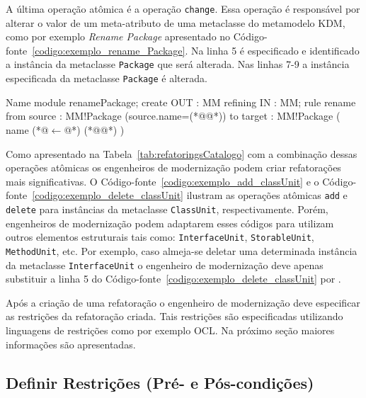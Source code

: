 A última operação atômica é a operação \texttt{change}. Essa operação é responsável por alterar o valor de um meta-atributo de uma metaclasse do metamodelo KDM, como por exemplo \textit{Rename Package} apresentado no Código-fonte~\ref{codigo:exemplo_rename_Package}. Na linha 5 é especificado e identificado a instância da metaclasse \texttt{Package} que será alterada. Nas linhas 7-9 a instância especificada da metaclasse \texttt{Package} é alterada.

\begin{codigo}[caption={[ATL para realizar a operação atômica \textit{change} \texttt{ClassUnit}.] ATL para realizar a operação atômica \textit{change} \texttt{ClassUnit}.},escapeinside={(*@}{@*)}, basicstyle=\footnotesize, label={codigo:exemplo_rename_Package}, language=ATL]{Name}
module renamePackage;
create OUT : MM refining IN : MM;
rule rename {
	from
		source : MM!Package (source.name=(*@@*))
	to 
		target : MM!Package (
			name (*@$\leftarrow$@*) (*@@*)
		)
}
\end{codigo}


Como apresentado na Tabela~\ref{tab:refatoringsCatalogo} com a combinação dessas operações atômicas os engenheiros de modernização podem criar refatorações mais significativas. O Código-fonte~\ref{codigo:exemplo_add_classUnit} e o Código-fonte~\ref{codigo:exemplo_delete_classUnit} ilustram as operações atômicas \texttt{add} e \texttt{delete} para instâncias da metaclasse \texttt{ClassUnit}, respectivamente. Porém, engenheiros de modernização podem adaptarem esses códigos para utilizam outros elementos estruturais tais como: \texttt{InterfaceUnit}, \texttt{StorableUnit}, \texttt{MethodUnit}, etc. Por exemplo, caso almeja-se deletar uma determinada instância da metaclasse \texttt{InterfaceUnit} o engenheiro de modernização deve apenas substituir a linha 5 do Código-fonte~\ref{codigo:exemplo_delete_classUnit} por . 

Após a criação de uma refatoração o engenheiro de modernização deve especificar as restrições da refatoração criada. Tais restrições são especificadas utilizando linguagens de restrições como por exemplo OCL. Na próximo seção maiores informações são apresentadas.

\subsection{Definir Restrições (Pré- e Pós-condições)}\label{sec:linguagem_de_restricao}

